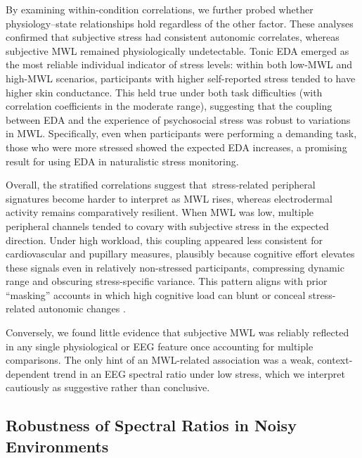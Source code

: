 \documentclass[lettersize,journal]{IEEEtran}
\begin{document}
By examining within-condition correlations, we further probed whether physiology–state relationships hold regardless of the other factor. These analyses confirmed that subjective stress had consistent autonomic correlates, whereas subjective MWL remained physiologically undetectable. Tonic EDA emerged as the most reliable individual indicator of stress levels: within both low-MWL and high-MWL scenarios, participants with higher self-reported stress tended to have higher skin conductance. This held true under both task difficulties (with correlation coefficients in the moderate range), suggesting that the coupling between EDA and the experience of psychosocial stress was robust to variations in MWL. Specifically, even when participants were performing a demanding task, those who were more stressed showed the expected EDA increases, a promising result for using EDA in naturalistic stress monitoring.

Overall, the stratified correlations suggest that \,stress-related peripheral signatures become harder to interpret as MWL rises, whereas electrodermal activity remains comparatively resilient. When MWL was low, multiple peripheral channels tended to covary with subjective stress in the expected direction. Under high workload, this coupling appeared less consistent for cardiovascular and pupillary measures, plausibly because cognitive effort elevates these signals even in relatively non-stressed participants, compressing dynamic range and obscuring stress-specific variance. This pattern aligns with prior ``masking'' accounts in which high cognitive load can blunt or conceal stress-related autonomic changes \cite{conwayEffectStressCognitive2013, setzDiscriminatingStressCognitive2010}.

Conversely, we found little evidence that subjective MWL was reliably reflected in any single physiological or EEG feature once accounting for multiple comparisons. The only hint of an MWL-related association was a weak, context-dependent trend in an EEG spectral ratio under low stress, which we interpret cautiously as suggestive rather than conclusive.


\subsection{Robustness of Spectral Ratios in Noisy Environments}
\end{document}
